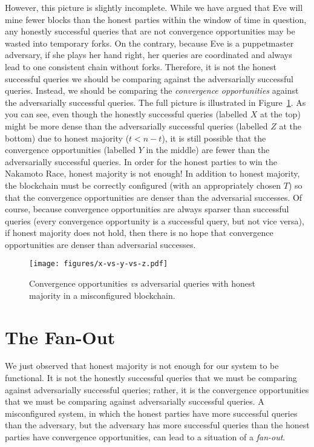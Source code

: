 However, this picture is slightly incomplete. While we have argued that Eve will mine fewer blocks
than the honest parties within the window of time in question, any honestly successful queries that are
not convergence opportunities may be wasted into temporary forks. On the contrary, because Eve
is a puppetmaster adversary, if she plays her hand right, her queries are coordinated and always
lead to one consistent chain without forks. Therefore, it is not the honest successful queries
we should be comparing against the adversarially successful queries. Instead, we should be comparing
the \emph{convergence opportunities} against the adversarially successful queries. The full
picture is illustrated in Figure~\ref{fig.x-vs-y-vs-z}. As you can see, even though the honestly
successful queries (labelled $X$ at the top) might be more dense than the adversarially successful queries
(labelled $Z$ at the bottom) due to honest majority ($t < n - t$), it is still possible that
the convergence opportunities (labelled $Y$ in the middle) are fewer than the adversarially successful
queries. In order for the honest parties to win the Nakamoto Race, honest majority is not enough!
In addition to honest majority, the blockchain must be correctly configured (with an appropriately
chosen $T$) so that the convergence opportunities are denser than the adversarial successes.
Of course, because convergence opportunities are always sparser than successful queries
(every convergence opportunity is a successful query, but not vice versa),
if honest majority does not hold, then there is no hope that convergence opportunities are denser
than adversarial successes.

\begin{figure}[h]
    \centering
    \texttt{[image: figures/x-vs-y-vs-z.pdf]}
    \caption{Convergence opportunities \emph{vs} adversarial queries with honest majority
             in a misconfigured blockchain.}
    \label{fig.x-vs-y-vs-z}
\end{figure}

\section{The Fan-Out}

We just observed that honest majority is not enough for our system to be functional. It is not
the honestly successful queries that we must be comparing against adversarially successful queries;
rather, it is the convergence opportunities that we must be comparing against adversarially successful
queries. A misconfigured system, in which the honest parties have more successful queries than the
adversary, but the adversary has more successful queries than the honest parties have convergence
opportunities, can lead to a situation of a \emph{fan-out}.

